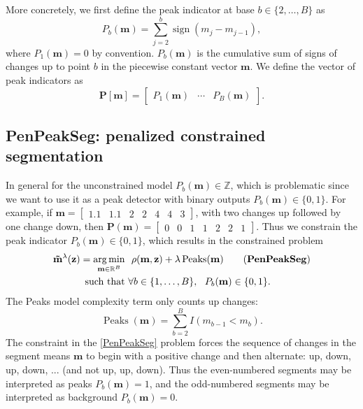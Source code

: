 \documentclass{article}
\DeclareMathOperator*{\argmin}{arg\,min}
\DeclareMathOperator*{\sign}{sign}
\DeclareMathOperator*{\Peaks}{Peaks}
\newcommand{\ZZ}{\mathbb Z}
\newcommand{\RR}{\mathbb R}
\begin{document}
More concretely, we first define the peak indicator at base
$b\in\{2, \dots, B\}$ as
\begin{equation}
  \label{eq:peaks}
  P_b(\mathbf m) = \sum_{j=2}^b \sign( m_{j} - m_{j-1} ),
\end{equation}
where $P_1(\mathbf m)=0$ by convention. $P_b(\mathbf m)$ is the
cumulative sum of signs of changes up to point $b$ in the piecewise
constant vector $\mathbf m$. We define the vector of peak indicators
as
\begin{equation}
  \mathbf
  P[\mathbf m] = \left[
    \begin{array}{ccc}
      P_1(\mathbf m) & \cdots & P_B(\mathbf m)
    \end{array}\right].
\end{equation}

\subsection{PenPeakSeg: penalized constrained segmentation}
\label{sec:constrained}

In general for the unconstrained model $P_b(\mathbf m)\in\ZZ$, which
is problematic since we want to use it as a peak detector with binary
outputs $P_b(\mathbf m)\in \{0, 1\}$. 
For example, if $\mathbf m = \left[\begin{array}{ccccccc}1.1 &
    1.1 & 2 & 2 & 4 & 4 & 3\end{array}\right]$, with two changes up
followed by one change down, then $\mathbf P(\mathbf m) =
\left[\begin{array}{ccccccc}0 & 0 & 1 & 1 & 2 & 2 &
    1 \end{array}\right]$.
Thus we constrain the peak indicator $P_b(\mathbf m)\in\{0, 1\}$,
which results in the constrained problem
\begin{align*}
  \label{PenPeakSeg}
  \mathbf{\tilde m}^\lambda(\mathbf z)  =
  \argmin_{\mathbf m\in\RR^{B}} &\ \ 
    \rho(\mathbf m, \mathbf z) + \lambda\Peaks(\mathbf m)
    \tag{\textbf{PenPeakSeg}}
  \\
  \text{such that} &\ \forall b\in\{1, \dots, B\},
                     \ \ P_b(\mathbf m) \in\{0, 1\}.
\end{align*}
The Peaks model complexity term only counts up changes:
\begin{equation}
  \Peaks(\mathbf m) = \sum_{b=2}^B I(m_{b-1} < m_b).
\end{equation}
The constraint in the \ref{PenPeakSeg} problem forces the sequence of
changes in the segment means $\mathbf m$ to begin with a positive
change and then alternate: up, down, up, down, ... (and not up, up,
down). Thus the even-numbered segments may be interpreted as peaks
$P_b(\mathbf m)=1$, and the odd-numbered segments may be interpreted
as background $P_b(\mathbf m)=0$.
\end{document}
